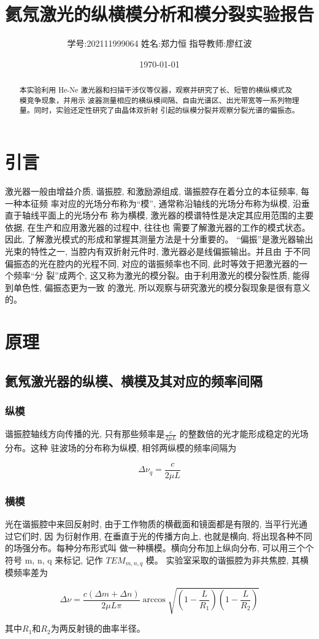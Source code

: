 \documentclass[12pt,a4paper]{article}
\title{\vspace{-4cm}\Large 氦氖激光的纵横模分析和模分裂实验报告}  %
\author{\kaishu 学号:202111999064 \hspace{2cm} 姓名:郑力恒 \hspace{2cm} 指导教师:廖红波}   %
\date{\today}
\newcommand{\be}[1]{
    \begin{equation}
        #1
    \end{equation}
}
\begin{document}
\maketitle

\begin{abstract}
    本实验利用 He-Ne 激光器和扫描干涉仪等仪器，观察并研究了长、短管的横纵模式及模竞争现象，并用示
波器测量相应的横纵模间隔、自由光谱区、出光带宽等一系列物理量。同时，实验还定性研究了由晶体双折射
引起的纵模分裂并观察分裂光谱的偏振态。
\end{abstract}

\section{引言}
激光器一般由增益介质, 谐振腔, 和激励源组成, 谐振腔存在着分立的本征频率, 每一种本征频
率对应的光场分布称为“模”, 通常称沿轴线的光场分布称为纵模, 沿垂直于轴线平面上的光场分布
称为横模, 激光器的模谱特性是决定其应用范围的主要依据, 在生产和应用激光器的过程中, 往往也
需要了解激光器的工作的模式状态。因此, 了解激光模式的形成和掌握其测量方法是十分重要的。
“偏振”是激光器输出光束的特性之一, 当腔内有双折射元件时, 激光器必是线偏振输出。并且由
于不同偏振态的光在腔内的光程不同, 对应的谐振频率也不同, 此时等效于把激光器的一个频率“分
裂”成两个, 这又称为激光的模分裂。由于利用激光的模分裂性质, 能得到单色性, 偏振态更为一致
的激光, 所以观察与研究激光的模分裂现象是很有意义的。

\section{原理}
\subsection{氦氖激光器的纵模、横模及其对应的频率间隔}
\subsubsection{纵模}
谐振腔轴线方向传播的光, 只有那些频率是$\frac{c}{2\mu L}$
的整数倍的光才能形成稳定的光场分布。这种
驻波场的分布称为纵模, 相邻两纵模的频率间隔为
\be{\Delta \nu_q=\frac{c}{2\mu L}}
\subsubsection{横模}
光在谐振腔中来回反射时, 由于工作物质的横截面和镜面都是有限的, 当平行光通过它们时, 因
为衍射作用, 在垂直于光的传播方向上, 也就是横向, 将出现各种不同的场强分布。每种分布形式叫
做一种横模。横向分布加上纵向分布, 可以用三个个符号 m, n, q 来标记, 记作 $TEM_{m,n,q}$ 模。
实验室采取的谐振腔为非共焦腔, 其横模频率差为
\be{\Delta \nu=\frac{c(\Delta m+\Delta n)}{2\mu L \pi}\arccos{\sqrt{(1-\frac{L}{R_1})(1-\frac{L}{R_2})}}}
其中$R_1$和$R_2$为两反射镜的曲率半径。
\end{document}
